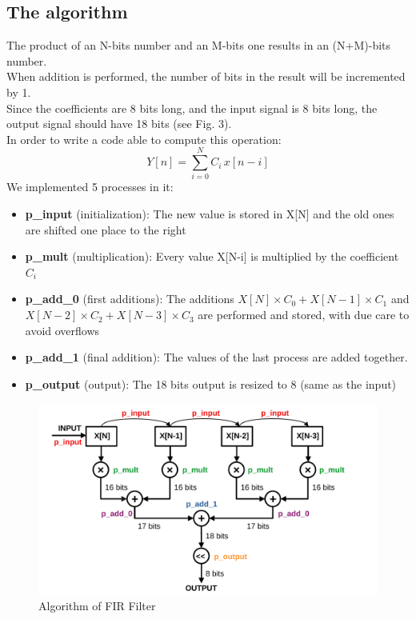 \documentclass[11pt,a4paper,twocolumn]{IEEEtran}
\begin{document}
	\subsection*{The algorithm}
	The product of an N-bits number and an M-bits one results in an (N+M)-bits number.\\
	When addition is performed, the number of bits in the result will be incremented by 1.\\
	Since the coefficients are 8 bits long, and the input signal is 8 bits long, the output signal should have 18 bits (see Fig. 3).\\
	In order to write a code able to compute this operation:
	$$ Y[n] = \sum_{i=0}^N C_i\, x[n-i] $$
	We implemented 5 processes in it:
	\begin{itemize}
	\item\textbf{p\_input} (initialization): The new value is stored in X[N] and the old ones are shifted one place to the right
	\item\textbf{p\_mult} (multiplication): Every value X[N-i] is multiplied by the coefficient $C_i$
	\item\textbf{p\_add\_0} (first additions): The additions $X[N]\times C_0 + X[N-1]\times C_1$ and $X[N-2]\times C_2 + X[N-3]\times C_3$ are performed and stored, with due care to avoid overflows
	\item\textbf{p\_add\_1} (final addition): The values of the last process are added together.
	\item\textbf{p\_output} (output): The 18 bits output is resized to 8 (same as the input)
	\end{itemize}
\begin{figure}[h]
	\hspace*{-.5cm}
	\includegraphics[width=1.2\linewidth]{img/firalg1pdf}
	\caption{Algorithm of FIR Filter}
\end{figure}
\end{document}
